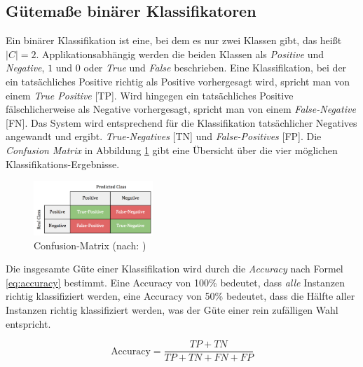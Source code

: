 \subsection{Gütemaße binärer Klassifikatoren}
\label{sec:howGoodIsMyClassifier}

Ein binärer Klassifikation ist eine, bei dem es nur zwei Klassen gibt, das heißt $|C| = 2$. Applikationsabhängig werden die beiden Klassen als \emph{Positive} und \emph{Negative}, $1$ und $0$ oder \emph{True} und \emph{False} beschrieben. Eine Klassifikation, bei der ein tatsächliches Positive richtig als Positive vorhergesagt wird, spricht man von einem \emph{True Positive} [TP]. Wird hingegen ein tatsächliches Positive fälschlicherweise als Negative vorhergesagt, spricht man von einem \emph{False-Negative} [FN]. Das System wird entsprechend für die Klassifikation tatsächlicher Negatives angewandt und ergibt. \emph{True-Negatives} [TN] und \emph{False-Positives} [FP]. Die \emph{Confusion Matrix} in Abbildung \ref{img:Confusion-Matrix} gibt eine Übersicht über die vier möglichen Klassifikations-Ergebnisse. \cite[S. 213 - 214]{machine_kubat}

\begin{figure}[h]
	\centering
	\includegraphics[width=0.4\textwidth]{bilder/Confusion-Matrix02.png}
	\caption{Confusion-Matrix (nach: \cite[S. 214]{machine_kubat})}
	\label{img:Confusion-Matrix}
\end{figure}

Die insgesamte Güte einer Klassifikation wird durch die \emph{Accuracy} nach Formel \ref{eq:accuracy} bestimmt. Eine Accuracy von 100\% bedeutet, dass \emph{alle} Instanzen richtig klassifiziert werden, eine Accuracy von 50\% bedeutet, dass die Hälfte aller Instanzen richtig klassifiziert werden, was der Güte einer rein zufälligen Wahl entspricht. \cite[S. 214]{machine_kubat}

\begin{equation}
\text{Accuracy} = \frac{TP+TN}{TP+TN+FN+FP}
\label{eq:accuracy}
\end{equation}

